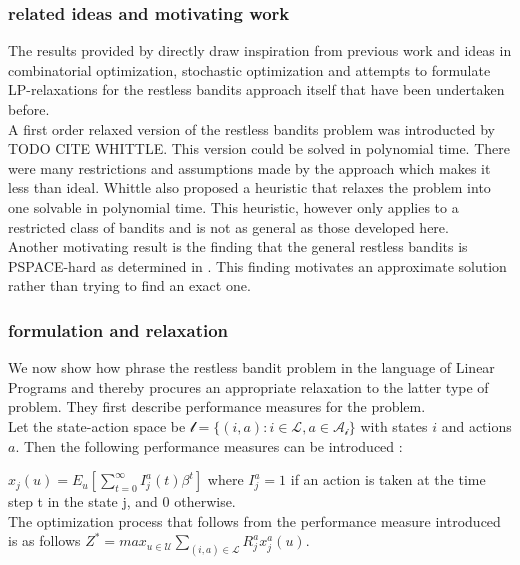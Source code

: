 \subsubsection{related ideas and motivating work}
The results provided by \citep{bertsimas} directly draw inspiration from previous work and ideas in combinatorial optimization, stochastic optimization and attempts to formulate LP-relaxations for the restless bandits approach itself that have been undertaken before. \\ 


A first order relaxed version of the restless bandits problem was introducted by TODO CITE WHITTLE. This version could be solved in polynomial time. There were many restrictions and assumptions made by the approach which makes it less than ideal. Whittle also proposed a heuristic that relaxes the problem into one solvable in polynomial time. This heuristic, however only applies to a restricted class of bandits and is not as general as those developed here.\\

Another motivating result is the finding that the general restless bandits is PSPACE-hard as determined in \citep{Papad}. This finding motivates an approximate solution rather than trying to find an exact one. \\ 

\subsubsection{formulation and relaxation}

We now show how \citep{bertsimas} phrase the restless bandit problem in the language of Linear Programs and thereby procures an appropriate relaxation to the latter type of problem. They first describe performance measures for the problem.\\

Let the state-action space be  $\mathcal{l} = \{(i,a): i \in \mathcal{L}, a \in  \mathcal{A_i} \}$
with states $i$ and actions $a$. Then the following performance measures can be introduced :

$x_j(u) = E_u[\sum_{t=0}^{\infty}I_j^a(t) \beta^t]$ where $I_j^a = 1$ if an action is taken at the time step t in the state j, and 0 otherwise. \\

The optimization process that follows from the performance measure introduced is as follows 
$Z^* = max_{u \in \mathcal{U}} \sum_{(i,a) \in \mathcal{L}} R_j^a x_j^a(u)$.  \\

